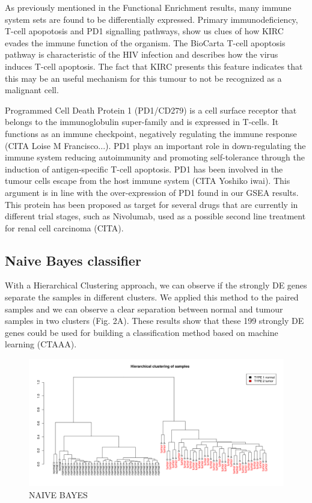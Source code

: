 \documentclass[9pt,twocolumn,twoside]{gsajnl}
\begin{document}
As previously mentioned in the Functional Enrichment results, many immune system sets are found to be differentially expressed. Primary immunodeficiency, T-cell apopotosis and PD1 signalling pathways, show us clues of how KIRC evades the immune function of the organism. The BioCarta T-cell apoptosis pathway is characteristic of the HIV infection and describes how the virus induces T-cell apoptosis. The fact that KIRC presents this feature indicates that this may be an useful mechanism for this tumour to not be recognized as a malignant cell.

Programmed Cell Death Protein 1 (PD1/CD279) is a cell surface receptor that belongs to the immunoglobulin super-family and is expressed in T-cells. It functions as an immune checkpoint, negatively regulating the immune response (CITA Loise M Francisco...). PD1 plays an important role in down-regulating the immune system reducing autoimmunity and promoting self-tolerance through the induction of antigen-specific T-cell apoptosis.
PD1 has been involved in the tumour cells escape from the host immune system (CITA Yoshiko iwai). This argument is in line with the over-expression of PD1 found in our GSEA results. This protein has been proposed as target for several drugs that are currently in different trial stages, such as Nivolumab, used as a possible second line treatment for renal cell carcinoma (CITA).


\subsection*{Naive Bayes classifier}
With a Hierarchical Clustering approach, we can observe if the strongly DE genes separate the samples in different clusters. We applied this method to the paired samples and we can observe a clear separation between normal and tumour samples in two clusters (Fig. 2A). These results show that these 199 strongly DE genes could be used for building a classification method based on machine learning (CTAAA). 

\begin{figure}[htbp]
\centering
\includegraphics[width=\textwidth]{figures/fig2.png}
\caption{NAIVE BAYES}%
\label{fig:spectrum}
\end{figure}
\end{document}
